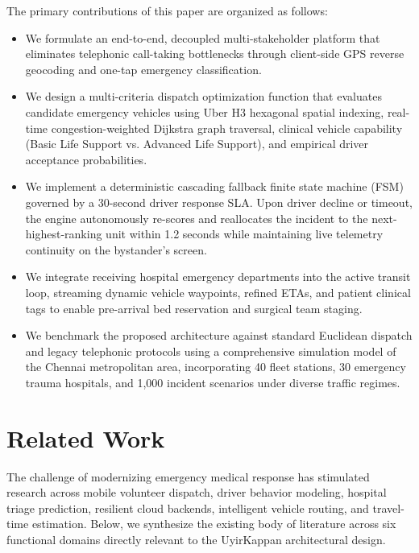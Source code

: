 \documentclass[conference]{IEEEtran}
\begin{document}
The primary contributions of this paper are organized as follows:
\begin{itemize}
    \item We formulate an end-to-end, decoupled multi-stakeholder platform that eliminates telephonic call-taking bottlenecks through client-side GPS reverse geocoding and one-tap emergency classification.
    \item We design a multi-criteria dispatch optimization function that evaluates candidate emergency vehicles using Uber H3 hexagonal spatial indexing, real-time congestion-weighted Dijkstra graph traversal, clinical vehicle capability (Basic Life Support vs. Advanced Life Support), and empirical driver acceptance probabilities.
    \item We implement a deterministic cascading fallback finite state machine (FSM) governed by a 30-second driver response SLA. Upon driver decline or timeout, the engine autonomously re-scores and reallocates the incident to the next-highest-ranking unit within 1.2 seconds while maintaining live telemetry continuity on the bystander's screen.
    \item We integrate receiving hospital emergency departments into the active transit loop, streaming dynamic vehicle waypoints, refined ETAs, and patient clinical tags to enable pre-arrival bed reservation and surgical team staging.
    \item We benchmark the proposed architecture against standard Euclidean dispatch and legacy telephonic protocols using a comprehensive simulation model of the Chennai metropolitan area, incorporating 40 fleet stations, 30 emergency trauma hospitals, and 1,000 incident scenarios under diverse traffic regimes.
\end{itemize}

\section{Related Work}
The challenge of modernizing emergency medical response has stimulated research across mobile volunteer dispatch, driver behavior modeling, hospital triage prediction, resilient cloud backends, intelligent vehicle routing, and travel-time estimation. Below, we synthesize the existing body of literature across six functional domains directly relevant to the UyirKappan architectural design.
\end{document}

